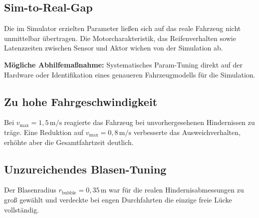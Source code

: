 \subsection{Sim-to-Real-Gap}
\label{subsec:sim2real}

Die im Simulator erzielten Parameter ließen sich auf das reale
Fahrzeug nicht unmittelbar übertragen.
Die Motorcharakteristik, das Reifenverhalten sowie Latenzzeiten
zwischen Sensor und Aktor wichen von der Simulation ab.

\textbf{Mögliche Abhilfemaßnahme:} Systematisches Param-Tuning
direkt auf der Hardware oder Identifikation eines genaueren
Fahrzeugmodells für die Simulation.

\subsection{Zu hohe Fahrgeschwindigkeit}
\label{subsec:speed}

Bei $v_{\max} = 1{,}5\,\text{m/s}$ reagierte das Fahrzeug
bei unvorhergesehenen Hindernissen zu träge.
Eine Reduktion auf $v_{\max} = 0{,}8\,\text{m/s}$ verbesserte
das Ausweichverhalten, erhöhte aber die Gesamtfahrtzeit deutlich.

\subsection{Unzureichendes Blasen-Tuning}
\label{subsec:bubble_tuning}

Der Blasenradius $r_{\text{bubble}} = 0{,}35\,\text{m}$ war
für die realen Hindernisabmessungen zu groß gewählt und verdeckte
bei engen Durchfahrten die einzige freie Lücke vollständig.
